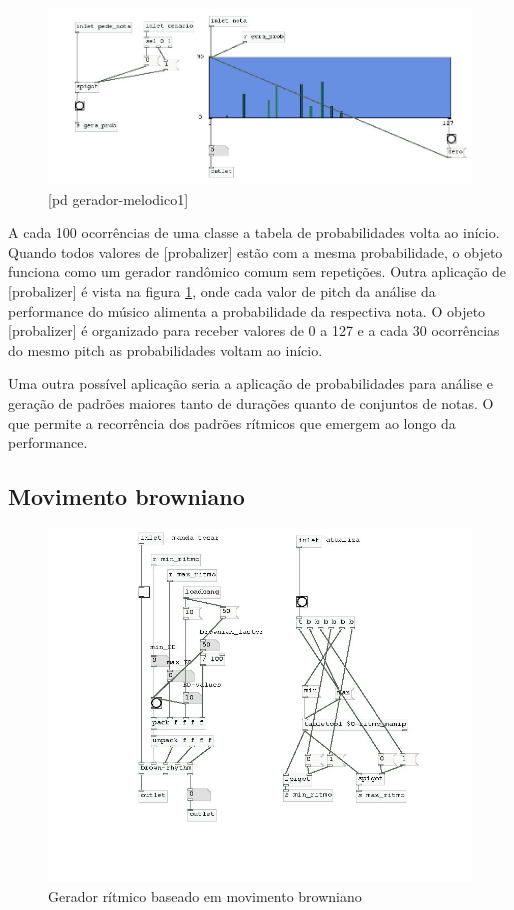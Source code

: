 \documentclass[draft]{ppgmus}
\begin{document}
\begin{figure}
\includegraphics[scale=.6]{gera-melodico1}
\caption{[pd gerador-melodico1]}
\label{gera-melodico1}
\end{figure}  

A cada 100 ocorrências de uma classe a tabela
de probabilidades volta ao início. Quando todos valores de [probalizer] estão
com a mesma probabilidade, o objeto funciona como um gerador randômico comum sem
repetições.
Outra aplicação de [probalizer] é vista na figura \ref{gera-melodico1},
onde cada valor de pitch da análise da performance do músico alimenta
a probabilidade da respectiva nota. O objeto [probalizer] é organizado
para receber valores de 0 a 127 e a cada 30 ocorrências do mesmo
pitch as probabilidades voltam ao início.


Uma outra possível aplicação seria a aplicação de probabilidades para
análise e geração de padrões maiores tanto de durações quanto de conjuntos
de notas. O que permite a recorrência dos padrões
rítmicos que emergem ao longo da performance.




\subsection{Movimento browniano}


\begin{figure}
\includegraphics[scale=.6]{gerador-ritmico2}
\caption{Gerador rítmico baseado em movimento browniano}
\label{gera-ritmico2}
\end{figure}  
\end{document}

